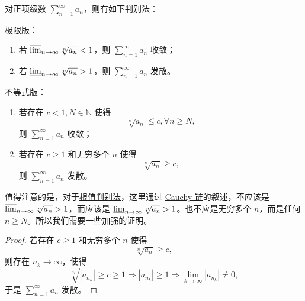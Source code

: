 \documentclass[../../main.tex]{subfiles}
\begin{document}
\begin{theorem}[根值判别法]\label{theorem:级数-根值判别法}
对正项级数 \(\sum_{n=1}^\infty a_n\)，则有如下判别法：

极限版：
\begin{enumerate}
\item 若 \(\varlimsup_{n \to \infty} \sqrt[n]{a_n} < 1\)，则 \(\sum_{n=1}^\infty a_n\) 收敛；

\item 若 \(\varliminf_{n \to \infty} \sqrt[n]{a_n} > 1\)，则 \(\sum_{n=1}^\infty a_n\) 发散。
\end{enumerate}

不等式版：
\begin{enumerate}
\item 若存在 \( c < 1, N \in \mathbb{N} \) 使得
\[
\sqrt[n]{a_n} \leqslant c, \forall n \geqslant N,
\]
则 \(\sum_{n=1}^\infty a_n\) 收敛；

\item 若存在 \( c \geqslant 1 \) 和无穷多个 \( n \) 使得
\[
\sqrt[n]{a_n} \geqslant c,
\]
则 \(\sum_{n=1}^\infty a_n\) 发散。
\end{enumerate}
\end{theorem}
\begin{remark}
值得注意的是，对于\hyperref[theorem:级数-根值判别法]{根值判别法}，这里通过 \hyperref[theorem:Cauchy链]{Cauchy 链}的叙述，不应该是 \(\varlimsup_{n \to \infty} \sqrt[n]{a_n} > 1\)，而应该是 \(\varliminf_{n \to \infty} \sqrt[n]{a_n} > 1\)。也不应是无穷多个 \( n \)，而是任何 \( n \geqslant N \)。所以我们需要一些加强的证明。
\end{remark}
\begin{proof}
若存在 \( c \geqslant 1 \) 和无穷多个 \( n \) 使得
\[
\sqrt[n]{a_n} \geqslant c,
\]
则存在 \( n_k \to \infty \)，使得
\[
\sqrt[n_k]{|a_{n_k}|} \geqslant c \geqslant 1 \Rightarrow |a_{n_k}| \geqslant 1 \Rightarrow \lim_{k \to \infty} |a_{n_k}| \neq 0,
\]
于是 \(\sum_{n=1}^\infty a_n\) 发散。
\end{proof}
 
\end{document}
